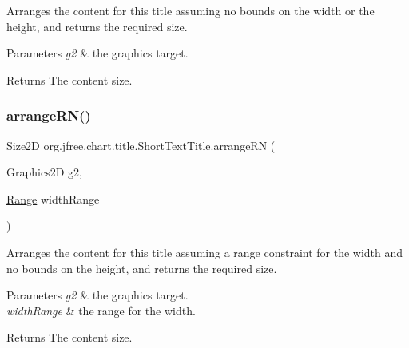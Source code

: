 Arranges the content for this title assuming no bounds on the width or the height, and returns the required size.


\begin{DoxyParams}{Parameters}
{\em g2} & the graphics target.\\
\hline
\end{DoxyParams}
\begin{DoxyReturn}{Returns}
The content size. 
\end{DoxyReturn}
\mbox{\label{classorg_1_1jfree_1_1chart_1_1title_1_1_short_text_title_af41e50ecbad106369c3a6718785c2915}} 
\subsubsection{\texorpdfstring{arrange\+R\+N()}{arrangeRN()}}
{\footnotesize\ttfamily Size2D org.\+jfree.\+chart.\+title.\+Short\+Text\+Title.\+arrange\+RN (\begin{DoxyParamCaption}\item[{Graphics2D}]{g2,  }\item[{\mbox{\hyperlink{classorg_1_1jfree_1_1data_1_1_range}{Range}}}]{width\+Range }\end{DoxyParamCaption})\hspace{0.3cm}{\ttfamily [protected]}}

Arranges the content for this title assuming a range constraint for the width and no bounds on the height, and returns the required size.


\begin{DoxyParams}{Parameters}
{\em g2} & the graphics target. \\
\hline
{\em width\+Range} & the range for the width.\\
\hline
\end{DoxyParams}
\begin{DoxyReturn}{Returns}
The content size. 
\end{DoxyReturn}
\mbox{\label{classorg_1_1jfree_1_1chart_1_1title_1_1_short_text_title_a0b79990e0d67ac4c313e2199f61aca9c}} 
